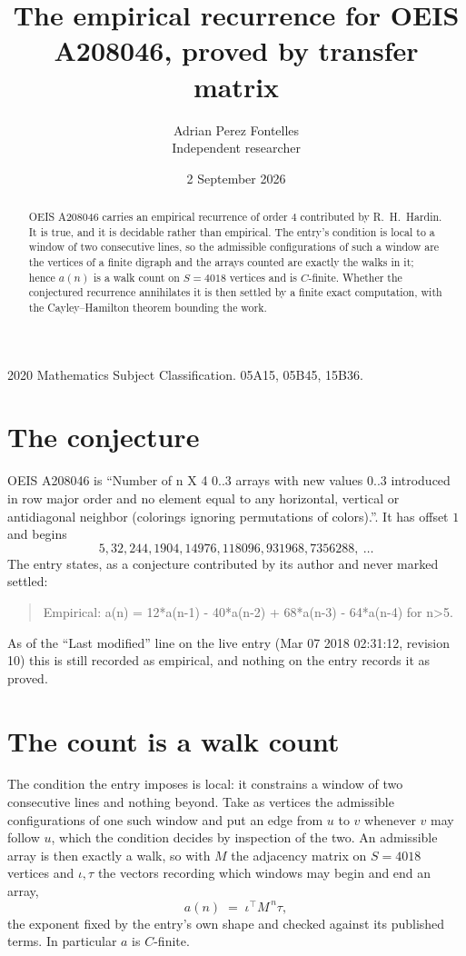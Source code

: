 \documentclass[11pt,a4paper]{article}
\title{The empirical recurrence for OEIS A208046, proved by transfer matrix}
\author{Adrian Perez Fontelles\\ \small Independent researcher}
\date{2 September 2026}
\theoremstyle{plain}
\theoremstyle{definition}
\begin{document}
\maketitle

\begin{abstract}
OEIS A208046 carries an empirical recurrence of order $4$ contributed by R.~H.~Hardin. It is
true, and it is decidable rather than empirical. The entry's condition is local to a window of two consecutive lines, so
the admissible configurations of such a window are the vertices of a finite digraph and the
arrays counted are exactly the walks in it; hence $a(n)$ is a walk count on $S=4018$ vertices
and is $C$-finite. Whether the conjectured recurrence annihilates it is then settled by a
finite exact computation, with the Cayley--Hamilton theorem bounding the work.
\end{abstract}

\noindent\small 2020 Mathematics Subject Classification. 05A15, 05B45, 15B36.\normalsize

\section{The conjecture}

OEIS A208046 is ``Number of n X 4 0..3 arrays with new values 0..3 introduced in row major order and no element equal to any horizontal, vertical or antidiagonal neighbor (colorings ignoring permutations of colors).''. It has offset $1$ and begins
\[
5, 32, 244, 1904, 14976, 118096, 931968, 7356288,\ \dots
\]
The entry states, as a conjecture contributed by its author and never marked settled:
\begin{quote}
Empirical: a(n) = 12*a(n-1) - 40*a(n-2) + 68*a(n-3) - 64*a(n-4) for n>5.
\end{quote}
As of the ``Last modified'' line on the live entry (Mar 07 2018 02:31:12, revision 10) this is still
recorded as empirical, and nothing on the entry records it as proved.

\section{The count is a walk count}

The condition the entry imposes is local: it constrains a window of two consecutive lines and nothing beyond. Take as
vertices the admissible configurations of one such window and put an edge from $u$ to $v$
whenever $v$ may follow $u$, which the condition decides by inspection of the two. An
admissible array is then exactly a walk, so with $M$ the adjacency matrix on $S=4018$ vertices
and $\iota,\tau$ the vectors recording which windows may begin and end an array,
\[
a(n)\;=\;\iota^{\!\top}M^{\,n}\tau ,
\]
the exponent fixed by the entry's own shape and checked against its published terms. In
particular $a$ is $C$-finite.
\end{document}
